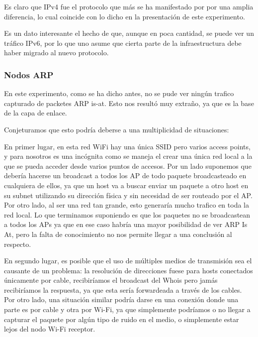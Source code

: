 \documentclass{article}
\theoremstyle{definition}
\theoremstyle{remark}
\begin{document}
Es claro que IPv4 fue el protocolo que más se ha manifestado por por una amplia diferencia, lo cual coincide con lo dicho en la presentación de este experimento. 

Es un dato interesante el hecho de que, aunque en poca cantidad, se puede ver un tráfico IPv6, por lo que uno asume que cierta parte de la infraestructura debe haber migrado al nuevo protocolo.

\subsubsection{Nodos ARP}

En este experimento, como se ha dicho antes, no se pude ver ningún trafico capturado de packetes ARP is-at. Esto nos resultó muy extraño, ya que es la base de la capa de enlace.\vspace{1mm}

Conjeturamos que esto podría deberse a una multiplicidad de situaciones:\vspace{1mm}

En primer lugar, en esta red WiFi hay una única SSID pero varios access points, y para nosotros es una incógnita como se maneja el crear una única red local a la que se pueda acceder desde varios puntos de accesos. Por un lado suponemos que debería hacerse un broadcast a todos los AP de todo paquete broadcasteado en cualquiera de ellos, ya que un host va a buscar enviar un paquete a otro host en su subnet utilizando su dirección física y sin necesidad de ser routeado por el AP. Por otro lado, al ser una red tan grande, esto generaría mucho trafico en toda la red local. Lo que terminamos suponiendo es que los paquetes no se broadcastean a todos los APs ya que en ese caso habría una mayor posibilidad de ver ARP Is At, pero la falta de conocimiento no nos permite llegar a una conclusión al respecto.\vspace{1mm}

En segundo lugar, es posible que el uso de múltiples medios de transmisión sea el causante de un problema: la resolución de direcciones fuese para hosts conectados únicamente por cable, recibiríamos el broadcast del Whois pero jamás recibiríamos la respuesta, ya que esta sería forwardeada a través de los cables. Por otro lado, una situación similar podría darse en una conexión donde una parte es por cable y otra por Wi-Fi, ya que simplemente podríamos o no llegar a capturar el paquete por algún tipo de ruido en el medio, o simplemente estar lejos del nodo Wi-Fi receptor.\vspace{1mm}
\end{document}
